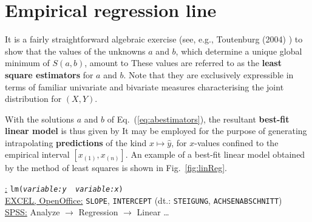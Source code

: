 \section[Empirical regression line]{Empirical regression line}
It is a fairly straightforward algebraic exercise (see, e.g., 
Toutenburg (2004) ) to show that the 
values of the unknowns $a$ and $b$, which determine a unique 
global minimum of $S(a,b)$, amount to
%
\be
{}
\ee
%
These values are referred to as the \textbf{least square
estimators} for $a$ and $b$. Note that they are exclusively
expressible in terms of familiar univariate and bivariate measures characterising the joint distribution for $(X,Y)$.

\medskip
\noindent
With the solutions $a$ and $b$ of Eq.~(\ref{eq:abestimators}), the 
resultant \textbf{best-fit linear model} is thus given by
%
%
\be
{}
\ee
%
It may be employed for the purpose of generating intrapolating 
\textbf{predictions} of the kind $x \mapsto \hat{y}$, for
$x$-values confined to the empirical interval $[x_{(1)},x_{(n)}]$.
An example of a best-fit linear model obtained by the method of
least squares is shown in Fig.~\ref{fig:linReg}.

\medskip
\noindent
\underline{\R:}
\texttt{lm(\textit{variable:y}~\texttildelow~\textit{variable:x})}
\\
\underline{EXCEL, OpenOffice:} \texttt{SLOPE}, \texttt{INTERCEPT}
(dt.: \texttt{STEIGUNG}, \texttt{ACHSENABSCHNITT}) \\
\underline{SPSS:} Analyze $\rightarrow$ Regression
$\rightarrow$ Linear \ldots

